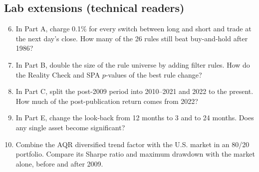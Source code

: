\subsection*{Lab extensions (technical readers)}

\begin{enumerate}
  \setcounter{enumi}{5}
  \item In Part A, charge 0.1\% for every switch between long and short and trade at the next day's close. How many of the 26 rules still beat buy-and-hold after 1986?
  \item In Part B, double the size of the rule universe by adding filter rules. How do the Reality Check and SPA $p$-values of the best rule change?
  \item In Part C, split the post-2009 period into 2010--2021 and 2022 to the present. How much of the post-publication return comes from 2022?
  \item In Part E, change the look-back from 12 months to 3 and to 24 months. Does any single asset become significant?
  \item Combine the AQR diversified trend factor with the U.S. market in an 80/20 portfolio. Compare its Sharpe ratio and maximum drawdown with the market alone, before and after 2009.
\end{enumerate}
